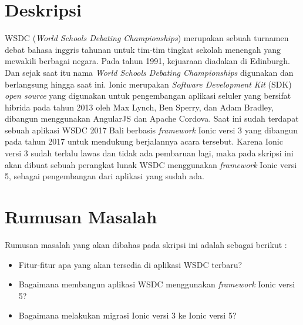 \documentclass[a4paper,twoside]{article}
\begin{document}
\title{\@judultopik}
\author{\nama \textendash \@npm} 

\newcommand{\nama}{Rajasa Cikal Maulana Solihin}
\newcommand{\@npm}{2017730084}
\newcommand{\@judultopik}{Pembuatan Ulang Aplikasi WSDC 2017 Bali dengan Ionic 5} %
\newcommand{\jumpemb}{1} %
\newcommand{\tanggal}{01/01/1900}


\maketitle


\section{Deskripsi}
WSDC ({\it World Schools Debating Championships}) merupakan sebuah turnamen debat bahasa inggris tahunan untuk tim-tim tingkat sekolah menengah yang mewakili berbagai negara. Pada tahun 1991, kejuaraan diadakan di Edinburgh. Dan sejak saat itu nama {\it World Schools Debating Championships} digunakan dan berlangsung hingga saat ini. Ionic merupakan {\it Software Development Kit} (SDK) {\it open source} yang digunakan untuk pengembangan aplikasi seluler yang bersifat hibrida pada tahun 2013 oleh Max Lynch, Ben Sperry, dan Adam Bradley, dibangun menggunakan AngularJS dan Apache Cordova. Saat ini sudah terdapat sebuah aplikasi WSDC 2017 Bali berbasis {\it framework} Ionic versi 3 yang dibangun pada tahun 2017 untuk mendukung berjalannya acara tersebut. Karena Ionic versi 3 sudah terlalu lawas dan tidak ada pembaruan lagi, maka pada skripsi ini akan dibuat sebuah perangkat lunak WSDC menggunakan {\it framework} Ionic versi 5, sebagai pengembangan dari aplikasi yang sudah ada. 

\section{Rumusan Masalah}
Rumusan masalah yang akan dibahas pada skripsi ini adalah sebagai berikut :
\begin{itemize}
	\item Fitur-fitur apa yang akan tersedia di aplikasi WSDC terbaru?
	\item Bagaimana membangun aplikasi WSDC menggunakan {\it framework} Ionic versi 5?
	\item Bagaimana melakukan migrasi Ionic versi 3 ke Ionic versi 5?
\end{itemize}
\end{document}
